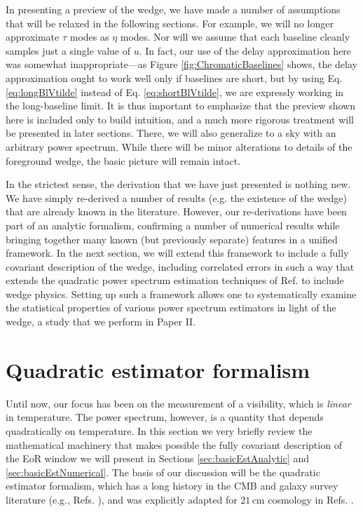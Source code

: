 \documentclass[twocolumn,aps,prd,nofootinbib,showpacs]{revtex4-1}
\begin{document}
In presenting a preview of the wedge, we have made a number of assumptions that will be relaxed in the following sections.  For example, we will no longer approximate $\tau$ modes as $\eta$ modes.  Nor will we assume that each baseline cleanly samples just a single value of $u$.  In fact, our use of the delay approximation here was somewhat inappropriate---as Figure \ref{fig:ChromaticBaselines} shows, the delay approximation ought to work well only if baselines are short, but by using Eq. \eqref{eq:longBlVtilde} instead of Eq. \eqref{eq:shortBlVtilde}, we are expressly working in the long-baseline limit.  It is thus important to emphasize that the preview shown here is included only to build intuition, and a much more rigorous treatment will be presented in later sections.  There, we will also generalize to a sky with an arbitrary power spectrum.  While there will be minor alterations to details of the foreground wedge, the basic picture will remain intact.

In the strictest sense, the derivation that we have just presented is nothing new.  We have simply re-derived a number of results (e.g. the existence of the wedge) that are already known in the literature.  However, our re-derivations have been part of an analytic formalism, confirming a number of numerical results while bringing together many known (but previously separate) features in a unified framework.  In the next section, we will extend this framework to include a fully covariant description of the wedge, including correlated errors in such a way that extends the quadratic power spectrum estimation techniques of Ref. \cite{Liu2011} to include wedge physics.  Setting up such a framework allows one to systematically examine the statistical properties of various power spectrum estimators in light of the wedge, a study that we perform in Paper II.

\section{Quadratic estimator formalism}
\label{sec:QuadEst}
Until now, our focus has been on the measurement of a visibility, which is \emph{linear} in temperature.  The power spectrum, however, is a quantity that depends quadratically on temperature.  In this section we very briefly review the mathematical machinery that makes possible the fully covariant description of the EoR window we will present in Sections \ref{sec:basicEstAnalytic} and \ref{sec:basicEstNumerical}.  The basis of our discussion will be the quadratic estimator formalism, which has a long history in the CMB and galaxy survey literature (e.g., Refs. \cite{Tegmark1997b,Bond1998,Tegmark1998}), and was explicitly adapted for $21\,\textrm{cm}$ cosmology in Refs. \cite{Liu2011,Dillon2013}.
\end{document}

